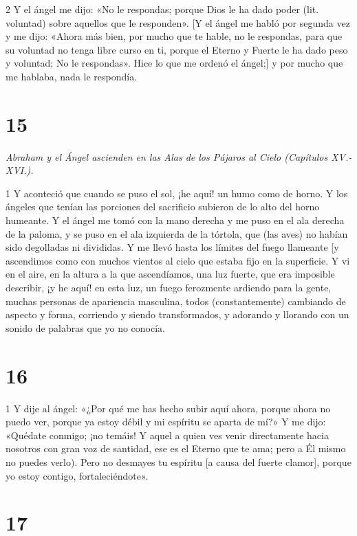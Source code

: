 \par 2 Y el ángel me dijo: «No le respondas; porque Dios le ha dado poder (lit. voluntad) sobre aquellos que le responden». [Y el ángel me habló por segunda vez y me dijo: «Ahora más bien, por mucho que te hable, no le respondas, para que su voluntad no tenga libre curso en ti, porque el Eterno y Fuerte le ha dado peso y voluntad; No le respondas». Hice lo que me ordenó el ángel;] y por mucho que me hablaba, nada le respondía.

\chapter{15}

\par \textit{Abraham y el Ángel ascienden en las Alas de los Pájaros al Cielo (Capítulos XV.-XVI.).}

\par 1 Y aconteció que cuando se puso el sol, ¡he aquí! un humo como de horno. Y los ángeles que tenían las porciones del sacrificio subieron de lo alto del horno humeante. Y el ángel me tomó con la mano derecha y me puso en el ala derecha de la paloma, y ​​se puso en el ala izquierda de la tórtola, que (las aves) no habían sido degolladas ni divididas. Y me llevó hasta los límites del fuego llameante [y ascendimos como con muchos vientos al cielo que estaba fijo en la superficie. Y vi en el aire, en la altura a la que ascendíamos, una luz fuerte, que era imposible describir, ¡y he aquí! en esta luz, un fuego ferozmente ardiendo para la gente, muchas personas de apariencia masculina, todos (constantemente) cambiando de aspecto y forma, corriendo y siendo transformados, y adorando y llorando con un sonido de palabras que yo no conocía.

\chapter{16}

\par 1 Y dije al ángel: «¿Por qué me has hecho subir aquí ahora, porque ahora no puedo ver, porque ya estoy débil y mi espíritu se aparta de mí?» Y me dijo: «Quédate conmigo; ¡no temáis! Y aquel a quien ves venir directamente hacia nosotros con gran voz de santidad, ese es el Eterno que te ama; pero a Él mismo no puedes verlo). Pero no desmayes tu espíritu [a causa del fuerte clamor], porque yo estoy contigo, fortaleciéndote».

\chapter{17}


